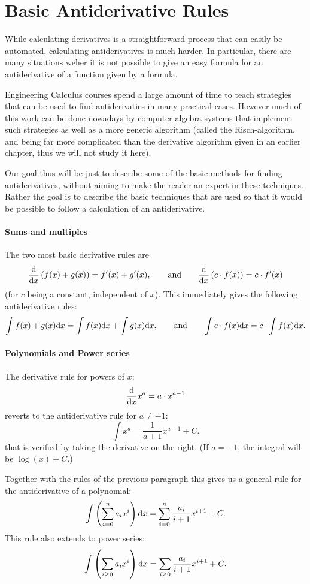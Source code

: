 \section{Basic Antiderivative Rules}

While calculating derivatives is a straightforward process that can easily
be automated, calculating antiderivatives is much harder. In particular,
there are many situations weher it is not possible to give an easy formula
for an antiderivative of a function given by a formula.

Engineering Calculus courses spend a large amount of time to teach
strategies that can be used to find antiderivaties in many practical cases.
However much of this work can be done nowadays by
computer algebra systems that implement such strategies as well as
a more generic algorithm (called
the Risch-algorithm, and being far more complicated than the derivative
algorithm given in an earlier chapter, thus we will not study it here).

Our goal thus will be just to describe some of the basic methods for finding
antiderivatives, without aiming to make the reader an expert in these
techniques. Rather the goal is to describe the basic techniques that are
used so that it would be possible to follow a calculation of an
antiderivative.

\paragraph{Sums and multiples}

The two most basic  derivative rules are 
\[
\frac{\mbox{d}}{\mbox{d}x} \left(f(x)+g(x)\right)=f'(x)+g'(x),\qquad\mbox{and}\qquad
\frac{\mbox{d}}{\mbox{d}x} \left(c\cdot f(x)\right)=c\cdot f'(x)
\]
(for $c$ being a constant, independent of $x$). This immediately gives the
following antiderivative rules:
\[
\int f(x)+g(x){\mbox{d}}x=\int f(x){\mbox{d}}x+\int g(x){\mbox{d}}x,\qquad\mbox{and}\qquad
\int c\cdot f(x){\mbox{d}}x=c\cdot \int f(x){\mbox{d}}x.
\]

\paragraph{Polynomials and Power series}

The derivative rule for powers of $x$:
\[
\frac{\mbox{d}}{\mbox{d}x} x^a=a\cdot x^{a-1}
\]
reverts to the antiderivative rule for $a\not=-1$:
\[
\int x^a=\frac{1}{a+1}x^{a+1}+C.
\]
that is verified by taking the derivative on the right. (If $a=-1$, the
integral will be $\log(x)+C$.)

Together with the rules of the previous paragraph this gives us a general
rule for the antiderivative of a polynomial:
\[
\int\left( \sum_{i=0}^n a_i x^i\right){\mbox{d}}x=
\sum_{i=0}^n \frac{a_i}{i+1} x^{i+1}+C.
\]
This rule also extends to power series:
\[
\int\left( \sum_{i\ge 0} a_i x^i\right){\mbox{d}}x=
\sum_{i\ge 0} \frac{a_i}{i+1} x^{i+1}+C.
\]

